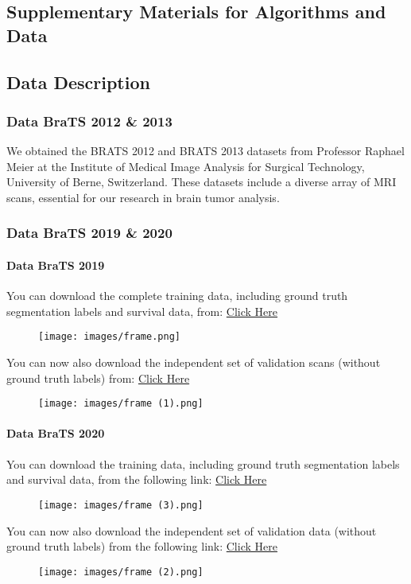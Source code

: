 \begin{appendices}

\chapter{Supplementary Materials for Algorithms and Data}
\section{Data Description}
\subsection{Data BraTS 2012 \& 2013}
We obtained the BRATS 2012 and BRATS 2013 datasets from Professor Raphael Meier at the Institute of Medical Image Analysis for Surgical Technology, University of Berne, Switzerland. These datasets include a diverse array of MRI scans, essential for our research in brain tumor analysis.
\subsection{Data BraTS 2019 \& 2020}
\subsubsection{Data BraTS 2019}
You can download the complete training data, including ground truth segmentation labels and survival data, from:
\href{https://www.cbica.upenn.edu/sbia/Spyridon.Bakas/MICCAI_BraTS/2019/MICCAI_BraTS_2019_Data_Training.zip}{Click Here}
\begin{figure}[H]
  \centering
  \texttt{[image: images/frame.png]}
  \label{fig:image1}
\end{figure}
You can now also download the independent set of validation scans (without ground truth labels) from:
\href{https://www.cbica.upenn.edu/sbia/Spyridon.Bakas/MICCAI_BraTS/2019/MICCAI_BraTS_2019_Data_Validation.zip}{Click Here}
\begin{figure}[H]
  \centering
  \texttt{[image: images/frame (1).png]}
  \label{fig:image1}
\end{figure}
\subsubsection{Data BraTS 2020}
You can download the training data, including ground truth segmentation labels and survival data, from the following link:
\href{https://www.cbica.upenn.edu/MICCAI_BraTS2020_TrainingData}{Click Here}
\begin{figure}[H]
  \centering
  \texttt{[image: images/frame (3).png]}
  \label{fig:image1}
\end{figure}
You can now also download the independent set of validation data (without ground truth labels) from the following link:
\href{https://www.cbica.upenn.edu/MICCAI_BraTS2020_ValidationData}{Click Here}
\begin{figure}[H]
  \centering
  \texttt{[image: images/frame (2).png]}
  \label{fig:image1}
\end{figure}

\end{appendices}
